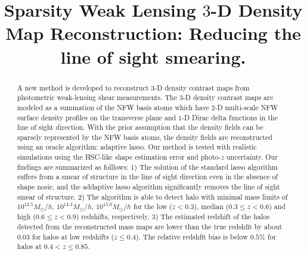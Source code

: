 \documentclass[twocolumn]{aastex62}
\begin{document}
\title{Sparsity Weak Lensing $3$-D Density Map Reconstruction:
Reducing the line of sight smearing.}

\begin{abstract}
A new method is developed to reconstruct $3$-D density contrast maps from photometric weak-lensing shear measurements.
The $3$-D density contrast maps are modeled as a summation of the NFW basis atoms which have $2$-D multi-scale NFW surface
density profiles on the transverse plane and $1$-D Dirac delta functions in the line of sight direction. With the prior
assumption that the density fields can be sparsely represented by the NFW basis atoms, the density fields are reconstructed 
using an oracle algorithm: adaptive lasso. Our method is tested with realistic simulations using the HSC-like shape estimation
error and photo-$z$ uncertainty.
Our findings are summarized as folllows: 
1) The solution of the standard lasso algorithm suffers from a smear of structure 
in the line of sight direction even in the absence of shape nosie, and the addaptive lasso algorithm significantly removes 
the line of sight smear of structure. 
2) The algorithm is able to detect halo with minimal mass limits of $10^{13.5} M_{\odot}/h$, $10^{14.3} M_{\odot}/h$, 
$10^{15.0} M_{\odot}/h$ for the low ($z<0.3$), median ($0.3\leq z< 0.6$) and high ($0.6\leq z< 0.9$) redshifts, respectively.
3) The estimated redshift of the halos detected from the reconstructed mass maps are
lower than the true redshfit by about $0.03$ for halos at low redshifts ($z\leq 0.4$). The relative redshfit bias is below 
$0.5\%$ for halos at $0.4<z\leq 0.85$.
\end{abstract}
\end{document}
